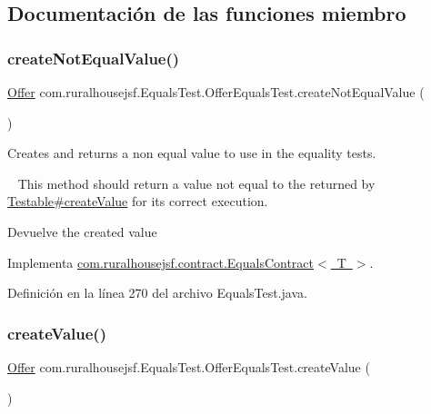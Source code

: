 \subsection{Documentación de las funciones miembro}
\mbox{\label{a00260_a459de0dbb86bdaa6f54b99eb887a2eab}} 
\subsubsection{\texorpdfstring{createNotEqualValue()}{createNotEqualValue()}}
{\footnotesize\ttfamily \mbox{\hyperlink{a00184}{Offer}} com.\+ruralhousejsf.\+Equals\+Test.\+Offer\+Equals\+Test.\+create\+Not\+Equal\+Value (\begin{DoxyParamCaption}{ }\end{DoxyParamCaption})}



Creates and returns a non equal value to use in the equality tests. 

~\newline
 This method should return a value not equal to the returned by \mbox{\hyperlink{}{Testable\#create\+Value}} for its correct execution.

\begin{DoxyReturn}{Devuelve}
the created value 
\end{DoxyReturn}


Implementa \mbox{\hyperlink{a00240_a65840509b57f6b89e42e2abf1978aa01}{com.\+ruralhousejsf.\+contract.\+Equals\+Contract$<$ T $>$}}.



Definición en la línea 270 del archivo Equals\+Test.\+java.

\mbox{\label{a00260_a25524d0ab8278899774751c0f7630e8d}} 
\subsubsection{\texorpdfstring{createValue()}{createValue()}}
{\footnotesize\ttfamily \mbox{\hyperlink{a00184}{Offer}} com.\+ruralhousejsf.\+Equals\+Test.\+Offer\+Equals\+Test.\+create\+Value (\begin{DoxyParamCaption}{ }\end{DoxyParamCaption})}



